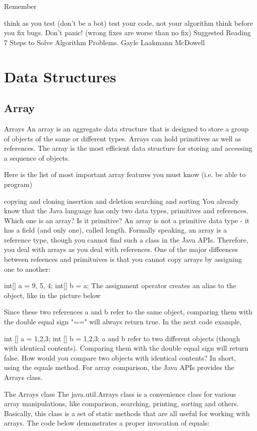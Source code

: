 Remember

think as you test (don't be a bot)
test your code, not your algorithm
think before you fix bugs. Don't panic! (wrong fixes are worse than no fix)
Suggested Reading
7 Steps to Solve Algorithm Problems. Gayle Laakmann McDowell

\section{Data Structures}

\subsection{Array}

Arrays
An array is an aggregate data structure that is designed to store a group of objects of the same or different types. Arrays can hold primitives as well as references. The array is the most efficient data structure for storing and accessing a sequence of objects.

Here is the list of most important array features you must know (i.e. be able to program)

copying and cloning
insertion and deletion
searching and sorting
You already know that the Java language has only two data types, primitives and references. Which one is an array? Is it primitive? An array is not a primitive data type - it has a field (and only one), called length. Formally speaking, an array is a reference type, though you cannot find such a class in the Java APIs. Therefore, you deal with arrays as you deal with references. One of the major diffeences between refeences and primituives is that you cannot copy arrays by assigning one to another:

int[] a = {9, 5, 4};
int[] b = a;
The assignment operator creates an alias to the object, like in the picture below



Since these two references a and b refer to the same object, comparing them with the double equal sign "==" will always return true. In the next code example,

int [] a = {1,2,3};
int [] b = {1,2,3};
a and b refer to two different objects (though with identical contents). Comparing them with the double equal sign will return false. How would you compare two objects with identical contents? In short, using the equals method. For array comparison, the Java APIs provides the Arrays class.

The Arrays class
The java.util.Arrays class is a convenience class for various array manipulations, like comparison, searching, printing, sorting and others. Basically, this class is a set of static methods that are all useful for working with arrays. The code below demonstrates a proper invocation of equals:

